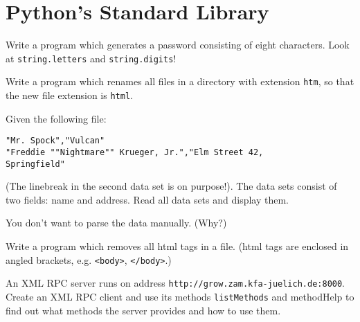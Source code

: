 \section*{Python's Standard Library}

\begin{aufgabe}
Write a program which generates a password consisting of eight characters. \hinweis Look at \lstinline{string.letters} and \lstinline{string.digits}!
\end{aufgabe}

\begin{aufgabe}
Write a program which renames all files in a directory with extension \texttt{htm}, so that the new file extension is \texttt{html}.
\end{aufgabe}

\begin{aufgabe}[CSV]
Given the following file:
\begin{verbatim}
"Mr. Spock","Vulcan"
"Freddie ""Nightmare"" Krueger, Jr.","Elm Street 42,
Springfield" 
\end{verbatim}
(The linebreak in the second data set is on purpose!). The data sets consist of two fields: name and address. Read all data sets and display them.

\hinweis You don't want to parse the data manually. (Why?)
\end{aufgabe}

\begin{aufgabe}
Write a program which removes all html tags in a file. (html tags are enclosed in angled brackets, e.g. \texttt{<body>}, \texttt{</body>}.)
\end{aufgabe}

\begin{aufgabe}
An XML RPC server runs on address \lstinline{http://grow.zam.kfa-juelich.de:8000}. Create an XML RPC client and use its methods \lstinline{listMethods} and {methodHelp} to find out what methods the server provides and how to use them.
\end{aufgabe}



